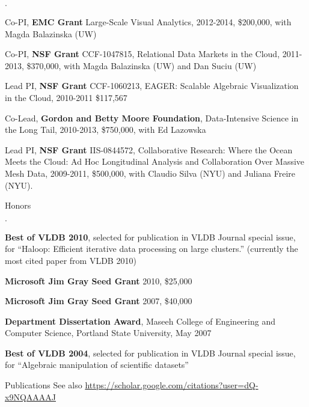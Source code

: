 \documentclass[10pt]{article}
\newenvironment{bulletlist}
   {
      \begin{list}
         {$\cdot$}
         {
            \setlength{\itemsep}{.5ex}
            \setlength{\parsep}{0ex}
            \setlength{\leftmargin}{0.7em}
            \setlength{\parskip}{0ex}
            \setlength{\topsep}{0ex}
         }
   }
   {
      \end{list}
   }
\newcommand{\marginlabel}[1]{
\begin{minipage}[b]{0.8\labelwidth}{\large \textsf{\textbf{#1}}}\end{minipage}}
\newcommand{\entrylabel}[1]{\mbox{\marginlabel{#1}}\hfill}
\newcommand{\MainListlabel}[1]
   {
      \parbox[t]{\labelwidth}{\hspace{.8em}\marginlabel{#1}}
   }
\newenvironment{MainList}[1]
   {
      \renewcommand{\entrylabel}{\MainListlabel}
      \begin{list}{}
      {
         \renewcommand{\makelabel}{\entrylabel}
         \setlength   {\itemindent}{-.65em}
         \setlength   {\labelwidth}{#1}
         \setlength   {\leftmargin}{\labelwidth}
         \setlength   {\itemsep}{3ex}
      }
   }
   {
      \end{list}
   }
\begin{document}
\begin{MainList}{88pt}
\begin{bulletlist}
\item Co-PI, {\bf EMC Grant} Large-Scale Visual Analytics, 2012-2014, \$200,000, with Magda Balazinska (UW)

\item Co-PI, {\bf NSF Grant} CCF-1047815, Relational Data Markets in the Cloud, 2011-2013, \$370,000, with Magda Balazinska (UW) and Dan Suciu (UW)

\item Lead PI, {\bf NSF Grant} CCF-1060213, EAGER: Scalable Algebraic Visualization in the Cloud, 2010-2011 \$117,567

\item Co-Lead, {\bf Gordon and Betty Moore Foundation}, Data-Intensive Science in the Long Tail, 2010-2013, \$750,000, with Ed Lazowska

\item Lead PI, {\bf NSF Grant} IIS-0844572, Collaborative Research: Where the Ocean Meets the Cloud: Ad Hoc Longitudinal Analysis and Collaboration Over Massive Mesh Data, 2009-2011, \$500,000, with Claudio Silva (NYU) and Juliana Freire (NYU).

\end{bulletlist}

\item [Honors]
\begin{bulletlist}


\item {\bf Best of VLDB 2010}, selected for publication in VLDB Journal special issue, for ``Haloop: Efficient iterative data processing on large clusters.'' (currently the most cited paper from VLDB 2010)

\item {\bf Microsoft Jim Gray Seed Grant} 2010, \$25,000

\item {\bf Microsoft Jim Gray Seed Grant} 2007, \$40,000

\item {\bf Department Dissertation Award}, Maseeh College of Engineering and Computer Science, Portland State University, May 2007

\item {\bf Best of VLDB 2004}, selected for publication in VLDB Journal special issue, for ``Algebraic manipulation of scientific datasets'' 

\end{bulletlist}

\item[Publications] 
See also \url{https://scholar.google.com/citations?user=dQ-x9NQAAAAJ}


\end{MainList}
\end{document}
